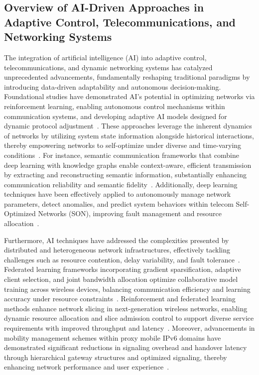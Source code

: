 \documentclass[sigconf]{acmart}
\begin{document}
\subsection{Overview of AI-Driven Approaches in Adaptive Control, Telecommunications, and Networking Systems}

The integration of artificial intelligence (AI) into adaptive control, telecommunications, and dynamic networking systems has catalyzed unprecedented advancements, fundamentally reshaping traditional paradigms by introducing data-driven adaptability and autonomous decision-making. Foundational studies have demonstrated AI's potential in optimizing networks via reinforcement learning, enabling autonomous control mechanisms within communication systems, and developing adaptive AI models designed for dynamic protocol adjustment~\cite{ref17,ref18,ref19,ref20}. These approaches leverage the inherent dynamics of networks by utilizing system state information alongside historical interactions, thereby empowering networks to self-optimize under diverse and time-varying conditions~\cite{ref1,ref2,ref3}. For instance, semantic communication frameworks that combine deep learning with knowledge graphs enable context-aware, efficient transmission by extracting and reconstructing semantic information, substantially enhancing communication reliability and semantic fidelity~\cite{ref1}. Additionally, deep learning techniques have been effectively applied to autonomously manage network parameters, detect anomalies, and predict system behaviors within telecom Self-Optimized Networks (SON), improving fault management and resource allocation~\cite{ref2}.

Furthermore, AI techniques have addressed the complexities presented by distributed and heterogeneous network infrastructures, effectively tackling challenges such as resource contention, delay variability, and fault tolerance~\cite{ref4,ref5,ref6}. Federated learning frameworks incorporating gradient sparsification, adaptive client selection, and joint bandwidth allocation optimize collaborative model training across wireless devices, balancing communication efficiency and learning accuracy under resource constraints~\cite{ref4,ref5}. Reinforcement and federated learning methods enhance network slicing in next-generation wireless networks, enabling dynamic resource allocation and slice admission control to support diverse service requirements with improved throughput and latency~\cite{ref6}. Moreover, advancements in mobility management schemes within proxy mobile IPv6 domains have demonstrated significant reductions in signaling overhead and handover latency through hierarchical gateway structures and optimized signaling, thereby enhancing network performance and user experience~\cite{ref19}.
\end{document}
